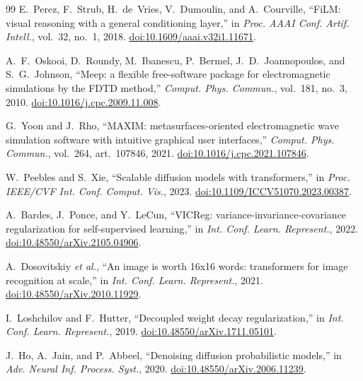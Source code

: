 \documentclass[pdflatex,oneside,sn-mathphys-num]{sn-jnl}
\theoremstyle{thmstyleone}
\theoremstyle{thmstyletwo}
\theoremstyle{thmstylethree}
\begin{document}
\begin{thebibliography}{99}
 E.~Perez, F.~Strub, H.~de~Vries, V.~Dumoulin, and A.~Courville, ``FiLM:
visual reasoning with a general conditioning layer,'' in \emph{Proc. AAAI Conf.
Artif. Intell.}, vol.~32, no.~1, 2018. \href{https://doi.org/10.1609/aaai.v32i1.11671}{doi:10.1609/aaai.v32i1.11671}.

 A.~F.~Oskooi, D.~Roundy, M.~Ibanescu, P.~Bermel, J.~D.~Joannopoulos, and
S.~G.~Johnson, ``Meep: a flexible free-software package for electromagnetic simulations
by the FDTD method,'' \emph{Comput. Phys. Commun.}, vol.~181, no.~3, 2010.
\href{https://doi.org/10.1016/j.cpc.2009.11.008}{doi:10.1016/j.cpc.2009.11.008}.

 G.~Yoon and J.~Rho, ``MAXIM: metasurfaces-oriented electromagnetic wave
simulation software with intuitive graphical user interfaces,''
\emph{Comput. Phys. Commun.}, vol.~264, art.~107846, 2021.
\href{https://doi.org/10.1016/j.cpc.2021.107846}{doi:10.1016/j.cpc.2021.107846}.

 W.~Peebles and S.~Xie, ``Scalable diffusion models with transformers,'' in \emph{Proc. IEEE/CVF Int. Conf. Comput. Vis.}, 2023. \href{https://doi.org/10.1109/ICCV51070.2023.00387}{doi:10.1109/ICCV51070.2023.00387}.

 A.~Bardes, J.~Ponce, and Y.~LeCun, ``VICReg: variance-invariance-covariance regularization for self-supervised learning,'' in \emph{Int. Conf. Learn. Represent.}, 2022. \href{https://doi.org/10.48550/arXiv.2105.04906}{doi:10.48550/arXiv.2105.04906}.

 A.~Dosovitskiy \emph{et al.}, ``An image is worth 16x16 words: transformers for image recognition at scale,'' in \emph{Int. Conf. Learn. Represent.}, 2021. \href{https://doi.org/10.48550/arXiv.2010.11929}{doi:10.48550/arXiv.2010.11929}.

 I.~Loshchilov and F.~Hutter, ``Decoupled weight decay regularization,'' in \emph{Int. Conf. Learn. Represent.}, 2019. \href{https://doi.org/10.48550/arXiv.1711.05101}{doi:10.48550/arXiv.1711.05101}.

 J.~Ho, A.~Jain, and P.~Abbeel, ``Denoising diffusion probabilistic models,'' in \emph{Adv. Neural Inf. Process. Syst.}, 2020. \href{https://doi.org/10.48550/arXiv.2006.11239}{doi:10.48550/arXiv.2006.11239}.

\end{thebibliography}
\endgroup
\end{document}
